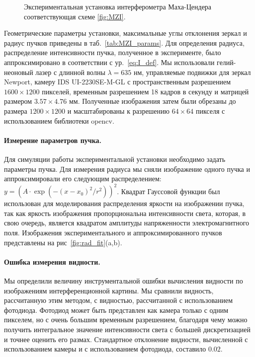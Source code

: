 \begin{figure}[ht]
\caption{Экспериментальная установка интерферометра Маха-Цендера соответствующая схеме \ref{fig:MZI}.}
\label{fig:MZI_exp}
\end{figure}

Геометрические параметры установки, максимальные углы отклонения зеркал и радиус пучков приведены в таб.~\ref{tab:MZI_params}. Для определения радиуса, распределение интенсивности пучка, полученное в эксперименте, было аппроксимировано в соответствии с ур.~\eqref{eq:I_def}. Мы использовали гелий-неоновый  лазер с длинной волны $\lambda =  635$ нм, управляемые подвижки для зеркал Newport, камеру IDS UI-2230SE-M-GL с пространственным разрешением $1600\times1200$ пикселей, временным разрешением 18 кадров в секунду и матрицей размером $3.57\times4.76$ мм. Полученные изображения затем были обрезаны до размера $1200\times1200$ и масштабированы к разрешению $64\times64$ пикселя с использованием библиотеки opencv.

\paragraph{Измерение параметров пучка.}
Для симуляции работы экспериментальной установки необходимо задать параметры пучка. Для измерения радиуса мы сняли изображение одного пучка и аппроксимировали его следующим распределением: $y = \left( A \cdot \exp(-(x - x_0)^2 / r^2) \right) ^2$. Квадрат Гауссовой функции был использован для моделирования распределения яркости на изображении пучка, так как яркость изображения пропорциональна интенсивности света, которая, в свою очередь, является квадратом амплитуды напряженности электромагнитного поля. Изображения экспериментального и аппроксимированного пучков представлены на рис~\ref{fig:rad_fit}(a,b). 

\paragraph{Ошибка измерения видности.}
Мы определили величину инструментальной ошибки вычисления видности по изображениям интерференционной картины. Мы сравнили видность, рассчитанную этим методом, с видностью, рассчитанной с использованием фотодиода. Фотодиод может быть представлен как камера только с одним пикселем, но с очень большим временным разрешением, благодаря чему можно получить интегральное значение интенсивности света с большей дискретизацией и точнее оценить его размах. Стандартное отклонение видности, вычисленной с использованием камеры и с использованием фотодиода, составило $0.02$.

